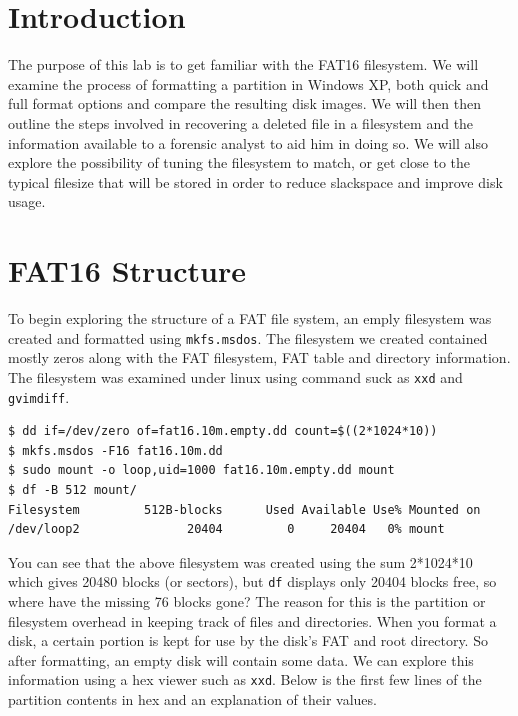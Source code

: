 \documentclass[a4paper,
    11pt,
    normalheadings,
    parindent,
    UKenglish,
    abstracton,
    ]{scrartcl}
\title{\mytitle{}}
\author{
    cand. Dipl. Inf. Tobias Müller <\href{mailto:muellet2@computing.dcu.ie?subject=ss10-forensic-lab01}{muellet2@}>, 59212333 \and
    BSc. Anthony Walters <\href{mailto:waltera3@computing.dcu.ie?subject=ss10-forensic-lab01}{waltera3@}>, 59213102
    }
\date{\today}
\begin{document}
\maketitle


\section{Introduction}
The purpose of this lab is to get familiar with the FAT16 filesystem. We will examine the process of formatting a partition in Windows XP, both quick and full format options and compare the resulting disk images. We will then then outline the steps involved in recovering a deleted file in a filesystem and the information available to a forensic analyst to aid him in doing so. We will also explore the possibility of tuning the filesystem to match, or get close to the typical filesize that will be stored in order to reduce slackspace and improve disk usage.

\section{FAT16 Structure}

To begin exploring the structure of a FAT file system, an emply filesystem was created and formatted using \texttt{mkfs.msdos}. The filesystem we created contained mostly zeros along with the FAT filesystem, FAT table and directory information. The filesystem was examined under linux using command suck as \texttt{xxd} and \texttt{gvimdiff}.
\begin{verbatim}
$ dd if=/dev/zero of=fat16.10m.empty.dd count=$((2*1024*10))
$ mkfs.msdos -F16 fat16.10m.dd
$ sudo mount -o loop,uid=1000 fat16.10m.empty.dd mount
$ df -B 512 mount/
Filesystem         512B-blocks      Used Available Use% Mounted on
/dev/loop2               20404         0     20404   0% mount
\end{verbatim}
You can see that the above filesystem was created using the sum 2*1024*10 which gives 20480 blocks (or sectors), but \texttt{df} displays only 20404 blocks free, so where have the missing 76 blocks gone? The reason for this is the partition or filesystem overhead in keeping track of files and directories. When you format a disk, a certain portion is kept for use by the disk's FAT and root directory. So after formatting, an empty disk will contain some data. We can explore this information using a hex viewer such as \texttt{xxd}. Below is the first few lines of the partition contents in hex and an explanation of their values.
\end{document}
